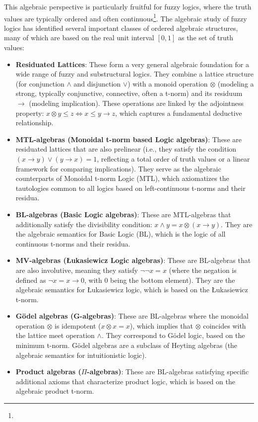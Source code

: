 This algebraic perspective is particularly fruitful for fuzzy logics, where the truth values are typically ordered and often continuous\footnote{}. The algebraic study of fuzzy logics has identified several important classes of ordered algebraic structures, many of which are based on the real unit interval $[0,1]$ as the set of truth values:
\begin{itemize}
    \item \textbf{Residuated Lattices}: These form a very general algebraic foundation for a wide range of fuzzy and substructural logics. They combine a lattice structure (for conjunction $\wedge$ and disjunction $\vee$) with a monoid operation $\otimes$ (modeling a strong, typically conjunctive, connective, often a t-norm) and its residuum $\rightarrow$ (modeling implication). These operations are linked by the adjointness property: $x \otimes y \leq z \iff x \leq y \rightarrow z$, which captures a fundamental deductive relationship.
    \item \textbf{MTL-algebras (Monoidal t-norm based Logic algebras)}: These are residuated lattices that are also prelinear (i.e., they satisfy the condition $(x \rightarrow y) \vee (y \rightarrow x) = 1$, reflecting a total order of truth values or a linear framework for comparing implications). They serve as the algebraic counterparts of Monoidal t-norm Logic (MTL), which axiomatizes the tautologies common to all logics based on left-continuous t-norms and their residua.
    \item \textbf{BL-algebras (Basic Logic algebras)}: These are MTL-algebras that additionally satisfy the divisibility condition: $x \wedge y = x \otimes (x \rightarrow y)$. They are the algebraic semantics for Basic Logic (BL), which is the logic of all continuous t-norms and their residua.
    \item \textbf{MV-algebras (Łukasiewicz Logic algebras)}: These are BL-algebras that are also involutive, meaning they satisfy $\neg \neg x = x$ (where the negation is defined as $\neg x = x \rightarrow 0$, with $0$ being the bottom element). They are the algebraic semantics for Łukasiewicz logic, which is based on the Łukasiewicz t-norm.
    \item \textbf{Gödel algebras (G-algebras)}: These are BL-algebras where the monoidal operation $\otimes$ is idempotent ($x \otimes x = x$), which implies that $\otimes$ coincides with the lattice meet operation $\wedge$. They correspond to Gödel logic, based on the minimum t-norm. Gödel algebras are a subclass of Heyting algebras (the algebraic semantics for intuitionistic logic).
    \item \textbf{Product algebras ($\Pi$-algebras)}: These are BL-algebras satisfying specific additional axioms that characterize product logic, which is based on the algebraic product t-norm.
\end{itemize}
















